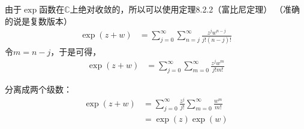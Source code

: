 \documentclass{article}
\begin{document}
\begin{itemize}
        由于$\exp$函数在$\mathbb{C}$上绝对收敛的，所以可以使用定理8.2.2（富比尼定理）
        （准确的说是复数版本）
        \begin{align*}
          \exp(z + w)
           & = \sum\limits_{j = 0}^\infty \sum \limits_{n = j}^\infty \frac{z^jw^{n - j}}{j!(n - j)!}
        \end{align*}
        令$m = n - j$，于是可得，
        \begin{align*}
          \exp(z + w)
           & = \sum\limits_{j = 0}^\infty \sum \limits_{m = 0}^\infty \frac{z^jw^m}{j!m!}
        \end{align*}

        分离成两个级数：
        \begin{align*}
          \exp(z + w)
           & = \sum\limits_{j = 0}^\infty \frac{z^j}{j!} \sum \limits_{m = 0}^\infty \frac{w^m}{m!} \\
           & = \exp(z) \exp(w)
        \end{align*}
\end{itemize}
\end{document}
